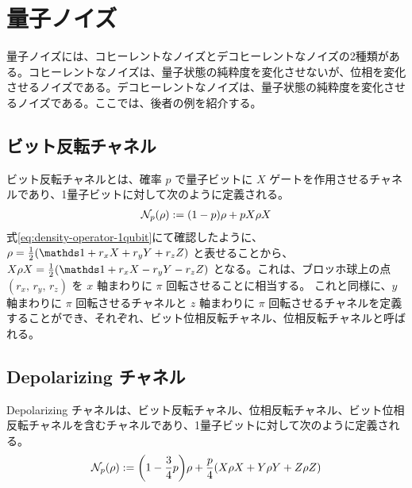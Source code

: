 


\section{量子ノイズ}
量子ノイズには、コヒーレントなノイズとデコヒーレントなノイズの2種類がある。コヒーレントなノイズは、量子状態の純粋度を変化させないが、位相を変化させるノイズである。デコヒーレントなノイズは、量子状態の純粋度を変化させるノイズである。ここでは、後者の例を紹介する。

\subsection*{ビット反転チャネル}
ビット反転チャネルとは、確率 $p$ で量子ビットに $X$ ゲートを作用させるチャネルであり、1量子ビットに対して次のように定義される。
\begin{align}
    \mathcal{N}_p(\rho) := (1 - p)\rho + pX{\rho}X
\end{align}
式\eqref{eq:density-operator-1qubit}にて確認したように、$\rho = \frac12(\bbid + r_x X + r_y Y + r_z Z)$ と表せることから、
$X{\rho}X = \frac12(\bbid + r_x X - r_y Y - r_z Z)$ となる。これは、ブロッホ球上の点 $(r_x,\,r_y,\,r_z)$ を $x$ 軸まわりに $\pi$ 回転させることに相当する。
これと同様に、$y$ 軸まわりに $\pi$ 回転させるチャネルと $z$ 軸まわりに $\pi$ 回転させるチャネルを定義することができ、それぞれ、ビット位相反転チャネル、位相反転チャネルと呼ばれる。

\subsection*{Depolarizing チャネル}\label{sec:depolarizing-channel}
Depolarizing チャネルは、ビット反転チャネル、位相反転チャネル、ビット位相反転チャネルを含むチャネルであり、1量子ビットに対して次のように定義される。
\begin{align}
    \mathcal{N}_p(\rho) := \qty(1 - \frac34p)\rho + \frac{p}{4}(X{\rho}X + Y{\rho}Y + Z{\rho}Z)
\end{align}

